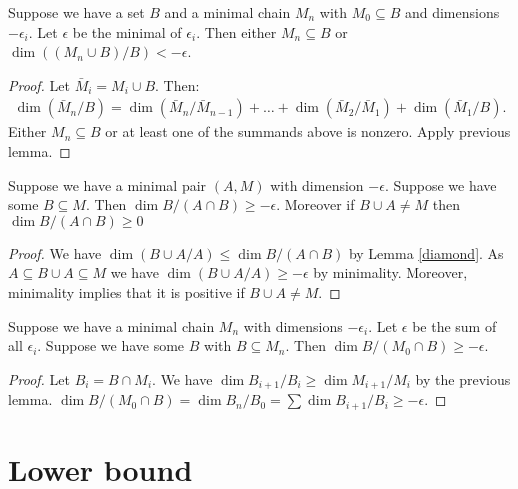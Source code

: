 \documentclass{amsart}
\begin{document}
\begin{Lemma}	\label{chain_lemma}
  Suppose we have a set $B$ and a minimal chain $M_n$ with $M_0 \subseteq B$ and dimensions $-\epsilon_i$.
  Let $\epsilon$ be the minimal of $\epsilon_i$.
  Then either $M_n \subseteq B$ or $\dim((M_n \cup B)/B) < -\epsilon$.
\end{Lemma}


\begin{proof}
  Let $\bar M_i = M_i \cup B$. Then:
  \begin{align*}
    \dim(\bar M_n/B) = \dim(\bar M_n/\bar M_{n-1}) + \ldots + \dim(\bar M_2/\bar M_1) + \dim(\bar M_1/B).
  \end{align*}
  Either $M_n \subseteq B$ or at least one of the summands above is nonzero.
  Apply previous lemma.
\end{proof}

\begin{Lemma} \label{minimal_subset}
  Suppose we have a minimal pair $(A, M)$ with dimension $-\epsilon$.
  Suppose we have some $B \subseteq M$.
  Then $\dim B / (A \cap B) \geq -\epsilon$.
  Moreover if $B \cup A \neq M$ then $\dim B / (A \cap B) \geq 0$
\end{Lemma}

\begin{proof}
  We have $\dim (B \cup A / A) \leq \dim B / (A \cap B)$ by Lemma \ref{diamond}.
  As $A \subseteq B \cup A \subseteq M$ we have $\dim (B \cup A / A) \geq -\epsilon$ by minimality.
  Moreover, minimality implies that it is positive if $B \cup A \neq M$.
\end{proof}

\begin{Lemma} \label{chain_intersect}
  Suppose we have a minimal chain $M_n$ with dimensions $-\epsilon_i$.
  Let $\epsilon$ be the sum of all $\epsilon_i$.
  Suppose we have some $B$ with $B \subseteq M_n$.
  Then $\dim B / (M_0 \cap B) \geq -\epsilon$.
\end{Lemma}

\begin{proof}
  Let $B_i = B \cap M_i$.
  We have $\dim B_{i+1}/B_i \geq \dim M_{i+1}/M_i$ by the previous lemma.
  $\dim B / (M_0 \cap B) = \dim B_n / B_0 = \sum \dim B_{i+1}/B_i \geq -\epsilon$.
\end{proof}

\section{Lower bound}
\end{document}
